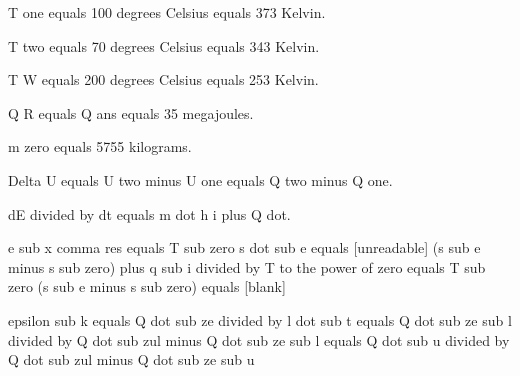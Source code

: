 T one equals 100 degrees Celsius equals 373 Kelvin.

T two equals 70 degrees Celsius equals 343 Kelvin.

T W equals 200 degrees Celsius equals 253 Kelvin.

Q R equals Q ans equals 35 megajoules.

m zero equals 5755 kilograms.

Delta U equals U two minus U one equals Q two minus Q one.

dE divided by dt equals m dot h i plus Q dot.

e sub x comma res equals T sub zero s dot sub e equals [unreadable] (s sub e minus s sub zero) plus q sub i divided by T to the power of zero equals T sub zero (s sub e minus s sub zero) equals [blank]

epsilon sub k equals Q dot sub ze divided by l dot sub t equals Q dot sub ze sub l divided by Q dot sub zul minus Q dot sub ze sub l equals Q dot sub u divided by Q dot sub zul minus Q dot sub ze sub u